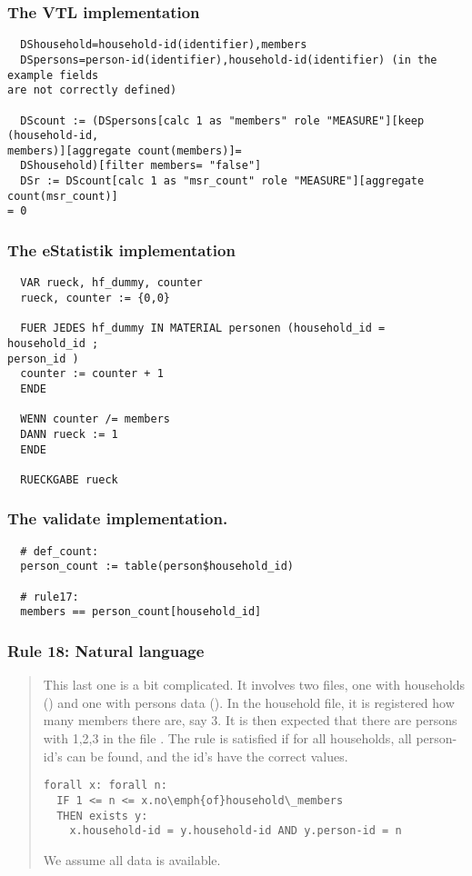 \subsubsection*{The VTL implementation}
\begin{verbatim}
  DShousehold=household-id(identifier),members
  DSpersons=person-id(identifier),household-id(identifier) (in the example fields
are not correctly defined)

  DScount := (DSpersons[calc 1 as "members" role "MEASURE"][keep (household-id,
members)][aggregate count(members)]=
  DShousehold)[filter members= "false"]
  DSr := DScount[calc 1 as "msr_count" role "MEASURE"][aggregate count(msr_count)]
= 0

\end{verbatim}
\subsubsection*{The eStatistik implementation}
\begin{verbatim}
  VAR rueck, hf_dummy, counter
  rueck, counter := {0,0}

  FUER JEDES hf_dummy IN MATERIAL personen (household_id = household_id ;
person_id )
  counter := counter + 1
  ENDE

  WENN counter /= members
  DANN rueck := 1
  ENDE

  RUECKGABE rueck
\end{verbatim}
\subsubsection*{The validate implementation.}
\begin{verbatim}
  # def_count:
  person_count := table(person$household_id)

  # rule17:
  members == person_count[household_id]
\end{verbatim}


\newpage

\subsubsection*{  Rule 18: Natural language}
\begin{quote}


This last one is a bit complicated. It involves two files, one with households () and one with persons data (). In the household file, it is registered how many members there are, say 3. It is then expected that
there are persons with  1,2,3 in the file . The rule is satisfied if for all households, all person-id's can be found, and the id's have the correct values.


\begin{verbatim}
forall x: forall n:
  IF 1 <= n <= x.no\emph{of}household\_members
  THEN exists y: 
    x.household-id = y.household-id AND y.person-id = n
\end{verbatim}


We assume all data is available.

\end{quote}
